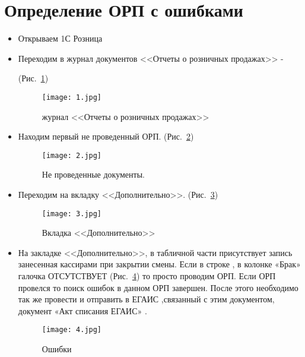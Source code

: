 \section{Определение ОРП с ошибками}
\begin{itemize}

	\item Открываем 1С Розница 
	\item Переходим в журнал документов <<Отчеты о розничных продажах>> -
	\par
	 (Рис.~\ref{ris:1.jpg})	
	\begin{figure}[H]
		\texttt{[image: 1.jpg]}
		\caption{журнал <<Отчеты о розничных продажах>>}
		\label{ris:1.jpg}
	\end{figure}
	\item Находим первый не проведенный  ОРП.
	(Рис.~\ref{ris:2.jpg})	
	\begin{figure}[H]
		\texttt{[image: 2.jpg]}
		\caption{Не проведенные документы.}
		\label{ris:2.jpg}
	\end{figure}
	
\newpage	
	\item Переходим на  вкладку <<Дополнительно>>.
	(Рис.~\ref{ris:3.jpg})	
	\begin{figure}[!ht]
		
		\texttt{[image: 3.jpg]}
		\caption{Вкладка <<Дополнительно>>}
		\label{ris:3.jpg}
	\end{figure}

	\item На закладке <<Дополнительно>>,  в табличной части присутствует запись занесенная кассирами при закрытии смены.
	Если  в строке , в колонке «Брак»  галочка ОТСУТСТВУЕТ (Рис.~\ref{ris:4.jpg})
	то просто проводим ОРП. Если ОРП провелся то поиск ошибок в данном ОРП завершен.  После этого необходимо так же провести и отправить в ЕГАИС ,связанный с этим документом,  документ «Акт списания ЕГАИС» .\par
		
	\begin{figure}[!ht]
		\texttt{[image: 4.jpg]}
		\caption{Ошибки}
		\label{ris:4.jpg}
	\end{figure}


\end{itemize}
